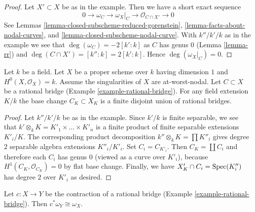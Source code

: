 \begin{proof}
Let $X' \subset X$ be as in the example. Then we have a short exact
sequence
$$
0 \to \omega_C \to \omega_X|_C \to \mathcal{O}_{C \cap X'} \to 0
$$
See Lemmas \ref{lemma-closed-subscheme-reduced-gorenstein},
\ref{lemma-facts-about-nodal-curves}, and
\ref{lemma-closed-subscheme-nodal-curve}.
With $k''/k'/k$ as in the example we see that
$\deg(\omega_C) = -2[k' : k]$ as $C$ has genus $0$
(Lemma \ref{lemma-rr})
and $\deg(C \cap X') = [k'' : k] = 2[k' : k]$.
Hence $\deg(\omega_X|_C) = 0$.
\end{proof}

\begin{lemma}
\label{lemma-rational-bridge-field-extension}
Let $k$ be a field. Let $X$ be a proper scheme over $k$ having dimension $1$
and $H^0(X, \mathcal{O}_X) = k$. Assume the singularities of $X$ are
at-worst-nodal. Let $C \subset X$ be a rational bridge
(Example \ref{example-rational-bridge}).
For any field extension $K/k$ the base change $C_K \subset X_K$
is a finite disjoint union of rational bridges.
\end{lemma}

\begin{proof}
Let $k''/k'/k$ be as in the example.
Since $k'/k$ is finite separable, we see that
$k' \otimes_k K = K'_1 \times \ldots \times K'_n$
is a finite product of finite separable extensions $K'_i/K$.
The corresponding product decomposition
$k'' \otimes_k K = \prod K''_i$ gives degree $2$
separable algebra extensions $K''_i/K'_i$.
Set $C_i = C_{K'_i}$. Then $C_K = \coprod C_i$
and therefore each $C_i$ has genus $0$ (viewed as a curve
over $K'_i$), because $H^1(C_K, \mathcal{O}_{C_K}) = 0$
by flat base change.
Finally, we have $X'_K \cap C_i = \mathop{\mathrm{Spec}}(K''_i)$ has degree $2$
over $K'_i$ as desired.
\end{proof}

\begin{lemma}
\label{lemma-rational-bridge-canonical}
Let $c : X \to Y$ be the contraction of a rational bridge
(Example \ref{example-rational-bridge}).
Then $c^*\omega_Y \cong \omega_X$.
\end{lemma}

